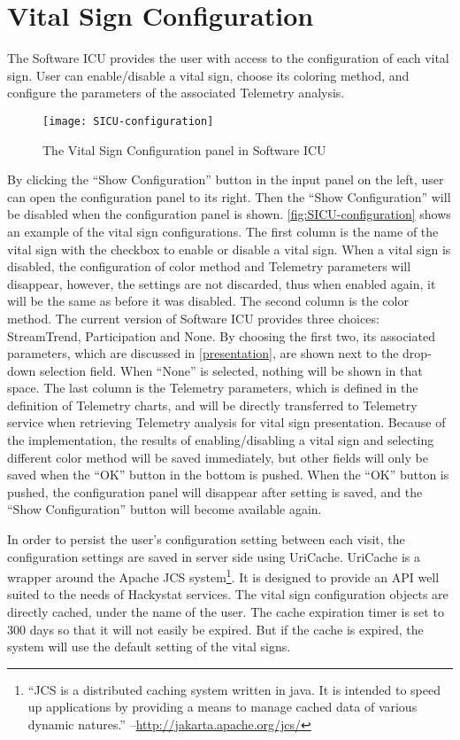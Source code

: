 \section{Vital Sign Configuration}
\label{SICUconfiguration}
The Software ICU provides the user with access to the configuration of each vital sign. User can enable/disable a vital sign, choose its coloring method, and configure the parameters of the associated Telemetry analysis. 

\begin{figure}[htbp]
   \centering
   \texttt{[image: SICU-configuration]} 
   \caption{The Vital Sign Configuration panel in Software ICU}
   \label{fig:SICU-configuration}
\end{figure}

By clicking the ``Show Configuration'' button in the input panel on the left, user can open the configuration panel to its right. Then the ``Show Configuration'' will be disabled when the configuration panel is shown. \autoref{fig:SICU-configuration} shows an example of the vital sign configurations. The first column is the name of the vital sign with the checkbox to enable or disable a vital sign. When a vital sign is disabled, the configuration of color method and Telemetry parameters will disappear, however, the settings are not discarded, thus when enabled again, it will be the same as before it was disabled. The second column is the color method. The current version of Software ICU provides three choices: StreamTrend, Participation and None. By choosing the first two, its associated parameters, which are discussed in \autoref{presentation}, are shown next to the drop-down selection field. When ``None'' is selected, nothing will be shown in that space. The last column is the Telemetry parameters, which is defined in the definition of Telemetry charts, and will be directly transferred to Telemetry service when retrieving Telemetry analysis for vital sign presentation. Because of the implementation, the results of enabling/disabling a vital sign and selecting different color method will be saved immediately, but other fields will only be saved when the ``OK'' button in the bottom is pushed. When the ``OK'' button is pushed, the configuration panel will disappear after setting is saved, and the ``Show Configuration'' button will become available again.

In order to persist the user's configuration setting between each visit, the configuration settings are saved in server side using UriCache. UriCache is a wrapper around the Apache JCS system\footnote{``JCS is a distributed caching system written in java. It is intended to speed up applications by providing a means to manage cached data of various dynamic natures.'' --\url{http://jakarta.apache.org/jcs/}}. It is designed to provide an API well suited to the needs of Hackystat services. The vital sign configuration objects are directly cached, under the name of the user. The cache expiration timer is set to 300 days so that it will not easily be expired. But if the cache is expired, the system will use the default setting of the vital signs.

